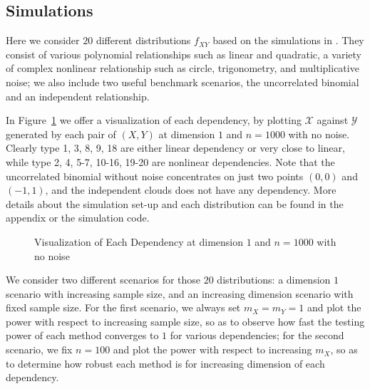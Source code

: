 \documentclass[12pt]{article}
\begin{document}
\subsection{Simulations}
\label{numer1}
Here we consider $20$ different distributions $f_{XY}$ based on the simulations in \cite{SzekelyRizzoBakirov2007, SimonTibshirani2012, GorfineHellerHeller2012, HellerGorfine2013}. They consist of various polynomial relationships such as linear and quadratic, a variety of complex nonlinear relationship such as circle, trigonometry, and multiplicative noise; we also include two useful benchmark scenarios, the uncorrelated binomial and an independent relationship. 

In Figure~\ref{fig0} we offer a visualization of each dependency, by plotting $\mathcal{X}$ against $\mathcal{Y}$ generated by each pair of $(X,Y)$ at dimension $1$ and $n=1000$ with no noise. Clearly type 1, 3, 8, 9, 18 are either linear dependency or very close to linear, while type 2, 4, 5-7, 10-16, 19-20 are nonlinear dependencies. Note that the uncorrelated binomial without noise concentrates on just two points $(0,0)$ and $(-1,1)$, and the independent clouds does not have any dependency. More details about the simulation set-up and each distribution can be found in the appendix or the simulation code.

\begin{figure}[htbp]
\caption{Visualization of Each Dependency at dimension $1$ and $n=1000$ with no noise}
\label{fig0}
\end{figure}

We consider two different scenarios for those $20$ distributions: a dimension $1$ scenario with increasing sample size, and an increasing dimension scenario with fixed sample size. For the first scenario, we always set $m_{X}=m_{Y}=1$ and plot the power with respect to increasing sample size, so as to observe how fast the testing power of each method converges to $1$ for various dependencies; for the second scenario, we fix $n=100$ and plot the power with respect to increasing $m_{X}$, so as to determine how robust each method is for increasing dimension of each dependency. 
\end{document}
